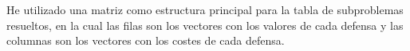 He utilizado una matriz como estructura principal para la tabla de subproblemas resueltos, en la cual las filas son los vectores con los valores de cada defensa y las columnas son los vectores con los costes de cada defensa.
